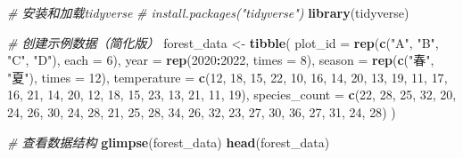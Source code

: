 \documentclass[
]{book}
\newenvironment{Shaded}{\begin{snugshade}}{\end{snugshade}}
\newcommand{\AttributeTok}[1]{\textcolor[rgb]{0.13,0.29,0.53}{#1}}
\newcommand{\CommentTok}[1]{\textcolor[rgb]{0.56,0.35,0.01}{\textit{#1}}}
\newcommand{\DecValTok}[1]{\textcolor[rgb]{0.00,0.00,0.81}{#1}}
\newcommand{\FunctionTok}[1]{\textcolor[rgb]{0.13,0.29,0.53}{\textbf{#1}}}
\newcommand{\NormalTok}[1]{#1}
\newcommand{\OtherTok}[1]{\textcolor[rgb]{0.56,0.35,0.01}{#1}}
\newcommand{\SpecialCharTok}[1]{\textcolor[rgb]{0.81,0.36,0.00}{\textbf{#1}}}
\newcommand{\StringTok}[1]{\textcolor[rgb]{0.31,0.60,0.02}{#1}}
\begin{document}
\begin{Shaded}
\begin{Highlighting}[]
\CommentTok{\# 安装和加载tidyverse}
\CommentTok{\# install.packages("tidyverse")}
\FunctionTok{library}\NormalTok{(tidyverse)}

\CommentTok{\# 创建示例数据（简化版）}
\NormalTok{forest\_data }\OtherTok{\textless{}{-}} \FunctionTok{tibble}\NormalTok{(}
  \AttributeTok{plot\_id =} \FunctionTok{rep}\NormalTok{(}\FunctionTok{c}\NormalTok{(}\StringTok{"A"}\NormalTok{, }\StringTok{"B"}\NormalTok{, }\StringTok{"C"}\NormalTok{, }\StringTok{"D"}\NormalTok{), }\AttributeTok{each =} \DecValTok{6}\NormalTok{),}
  \AttributeTok{year =} \FunctionTok{rep}\NormalTok{(}\DecValTok{2020}\SpecialCharTok{:}\DecValTok{2022}\NormalTok{, }\AttributeTok{times =} \DecValTok{8}\NormalTok{),}
  \AttributeTok{season =} \FunctionTok{rep}\NormalTok{(}\FunctionTok{c}\NormalTok{(}\StringTok{"春"}\NormalTok{, }\StringTok{"夏"}\NormalTok{), }\AttributeTok{times =} \DecValTok{12}\NormalTok{),}
  \AttributeTok{temperature =} \FunctionTok{c}\NormalTok{(}\DecValTok{12}\NormalTok{, }\DecValTok{18}\NormalTok{, }\DecValTok{15}\NormalTok{, }\DecValTok{22}\NormalTok{, }\DecValTok{10}\NormalTok{, }\DecValTok{16}\NormalTok{, }\DecValTok{14}\NormalTok{, }\DecValTok{20}\NormalTok{, }\DecValTok{13}\NormalTok{, }\DecValTok{19}\NormalTok{, }\DecValTok{11}\NormalTok{, }\DecValTok{17}\NormalTok{, }
                  \DecValTok{16}\NormalTok{, }\DecValTok{21}\NormalTok{, }\DecValTok{14}\NormalTok{, }\DecValTok{20}\NormalTok{, }\DecValTok{12}\NormalTok{, }\DecValTok{18}\NormalTok{, }\DecValTok{15}\NormalTok{, }\DecValTok{23}\NormalTok{, }\DecValTok{13}\NormalTok{, }\DecValTok{21}\NormalTok{, }\DecValTok{11}\NormalTok{, }\DecValTok{19}\NormalTok{),}
  \AttributeTok{species\_count =} \FunctionTok{c}\NormalTok{(}\DecValTok{22}\NormalTok{, }\DecValTok{28}\NormalTok{, }\DecValTok{25}\NormalTok{, }\DecValTok{32}\NormalTok{, }\DecValTok{20}\NormalTok{, }\DecValTok{24}\NormalTok{, }\DecValTok{26}\NormalTok{, }\DecValTok{30}\NormalTok{, }\DecValTok{24}\NormalTok{, }\DecValTok{28}\NormalTok{, }\DecValTok{21}\NormalTok{, }\DecValTok{25}\NormalTok{,}
                   \DecValTok{28}\NormalTok{, }\DecValTok{34}\NormalTok{, }\DecValTok{26}\NormalTok{, }\DecValTok{32}\NormalTok{, }\DecValTok{23}\NormalTok{, }\DecValTok{27}\NormalTok{, }\DecValTok{30}\NormalTok{, }\DecValTok{36}\NormalTok{, }\DecValTok{27}\NormalTok{, }\DecValTok{31}\NormalTok{, }\DecValTok{24}\NormalTok{, }\DecValTok{28}\NormalTok{)}
\NormalTok{)}

\CommentTok{\# 查看数据结构}
\FunctionTok{glimpse}\NormalTok{(forest\_data)}
\FunctionTok{head}\NormalTok{(forest\_data)}
\end{Highlighting}
\end{Shaded}
\end{document}
